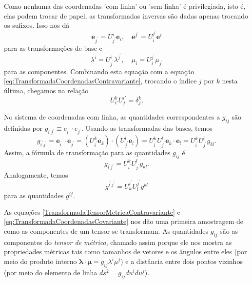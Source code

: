 Como nenhuma das coordenadas 'com linha' ou 'sem linha' é privilegiada, isto é, elas podem trocar de papel, as transformadas inversas são dadas apenas trocando os sufixos. Isso nos dá
\begin{equation}\label{eq:TransformadasBaseInversa}
	\mathbf{e}_{j^{\prime}}=U_{j^{\prime}}^{i} \mathbf{e}_{i}, \quad \mathbf{e}^{j^{\prime}}=U_{i}^{j^{\prime}} \mathbf{e}^{i} 
\end{equation}
para as transformações de base e
\begin{equation}\label{eq:TransformadasCoordenadasInversas}
	\lambda^{i}=U_{j^{\prime}}^{i} \lambda^{j^{\prime}}, \quad \mu_{i}=U_{i}^{j^{\prime}} \mu_{j^{\prime}}
\end{equation}
para as componentes. Combinando esta equação com a equação \eqref{eq:TransformadaCoordenadasContravariante}, trocando o índice $j$ por $k$ nesta última, chegamos na relação
\begin{equation}
	\boxed{
		U_{i'}^{k} U_{j}^{i'}=\delta_{j}^{k} .
	}
\end{equation}

No sistema de coordenadas com linha, as quantidades correspondentes a $g_{ij}$ são definidas por $g_{i^{\prime} j^{\prime}} \equiv e_{i^{\prime}} \cdot e_{j^{\prime}}$. Usando as transformadas das bases, temos
\[
	g_{i^{\prime} j^{\prime}}=\mathbf{e}_{i^{\prime}} \cdot \mathbf{e}_{j^{\prime}}=\left(U_{i^{\prime}}^{k} \mathbf{e}_{k}\right) \cdot\left(U_{j^{\prime}}^{l} \mathbf{e}_{l}\right)=U_{i^{\prime}}^{k} U_{j^{\prime}}^{l} \mathbf{e}_{k} \cdot \mathbf{e}_{l}=U_{i^{\prime}}^{k} U_{j^{\prime}}^{l} g_{k l} .
\]
Assim, a fórmula de transformação para as quantidades $g_{ij}$ é
\begin{equation}\label{TransformadaTensorMetricaContravariante}
	\boxed{
		g_{i^{\prime} j^{\prime}}=U_{i^{\prime}}^{k} U_{j^{\prime}}^{l} g_{k l} .
	}
\end{equation}
Analogamente, temos
\begin{equation}\label{TransformadaTensorMetricaCovariante}
	\boxed{
		g^{i^{\prime} j^{\prime}}=U^{i^{\prime}}_{k} U^{j^{\prime}}_{l} g^{k l} 
	}
\end{equation}
para as quantidades $g^{ij}$.

As equações \eqref{TransformadaTensorMetricaContravariante} e \eqref{eq:TransformadaCoordenadasCovariante} nos dão uma primeira amostragem de como as componentes de um tensor se transformam. As quantidades $g_{ij}$ são as componentes do \textit{tensor de métrica}, chamado assim porque ele nos mostra as propriedades métricas tais como tamanhos de vetores e os ângulos entre eles (por meio do produto interno $\boldsymbol{\lambda}\cdot\boldsymbol{\mu}=g_{ij}\lambda^i\mu^j$) e a distância entre dois pontos vizinhos (por meio do elemento de linha $ds^2=g_{ij}du^idu^j$).





